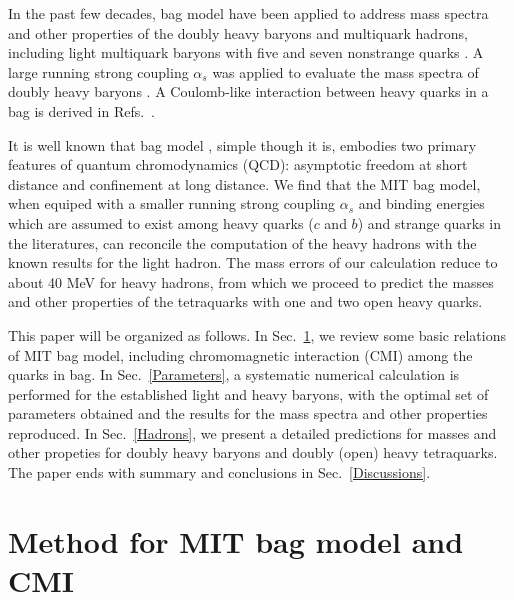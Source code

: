 \documentclass[prd,twocolumn,floatfix,nofootinbib]{revtex4}
\begin{document}
In the past few decades, bag model have been applied to address mass spectra and other properties of the doubly heavy baryons \cite{Fleck:1989mb,He:2004px, Bernotas:2012nz} and multiquark hadrons, including light multiquark baryons with five and seven nonstrange quarks \cite{Strottman:1979qu}. 
A large running strong coupling $\alpha_{s}$ was applied to evaluate the mass spectra of doubly heavy baryons \cite{He:2004px}. 
A Coulomb-like interaction between heavy quarks in a bag is derived in Refs.~\cite{Haxton:1980mc,Aerts:1980rf}.

It is well known that bag model \cite{DeGrand:1975cf}, simple though it is, embodies two primary features of quantum chromodynamics (QCD): asymptotic freedom at short distance and confinement at long distance. 
We find that the MIT bag model, when equiped with a smaller running strong coupling $\alpha_{s}$ and binding energies which are assumed to exist among heavy quarks ($c$ and $b$) and strange quarks in the literatures, 
can reconcile the computation of the heavy hadrons with the known results for the light hadron. 
The mass errors of our calculation reduce to about 40 MeV for heavy hadrons, from which we proceed to predict the masses and other properties of the tetraquarks with one and two open heavy quarks.

This paper will be organized as follows. In Sec.~\ref{Method}, we review some basic relations of MIT bag model, including chromomagnetic interaction (CMI) among the quarks in bag. 
In Sec.~\ref{Parameters}, a systematic numerical calculation is performed for the established light and heavy baryons, with the optimal set of parameters obtained and the results for the mass spectra and other properties reproduced.
In Sec.~\ref{Hadrons}, we present a detailed predictions for masses and other propeties for doubly heavy baryons and doubly (open) heavy tetraquarks. 
The paper ends with summary and conclusions in Sec.~\ref{Discussions}.


\section{Method for MIT bag model and CMI}\label{Method}
\end{document}
